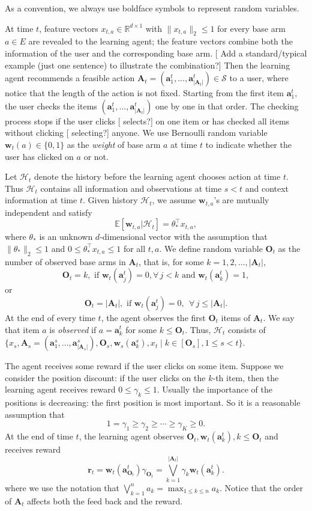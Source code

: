 \documentclass{article}
\newcommand{\EE}{\mathbb{E}}
\newcommand{\RR}{\mathbb{R}}
\newcommand{\bA}{\mathbf{A}}
\newcommand{\ba}{\mathbf{a}}
\newcommand{\bO}{\mathbf{O}}
\newcommand{\br}{\mathbf{r}}
\newcommand{\bw}{\mathbf{w}}
\newcommand{\cH}{\mathcal{H}}
\newcommand{\cS}{\mathcal{S}}
\newcommand{\abs}[1]{\left| #1 \right|}
\newcommand{\norm}[1]{\| #1 \|}
\newcommand{\shengyu}[1]{{\color{green!50!black} [\text{Shengyu:} #1]}}
\begin{document}
As a convention, we always use boldface symbols to represent random variables.

At time $t$, feature vectors $x_{t,a} \in \RR^{d \times 1}$ with $\norm{x_{t,a}}_2 \leq 1$ for every base arm $a \in E$ are revealed to the learning agent; the feature vectors combine both the information of the user and the corresponding base arm. \shengyu{Add a standard/typical example (just one sentence) to illustrate the combination?} Then the learning agent recommends a feasible action $\bA_t=(\ba_{1}^t,...,\ba_{\abs{\bA_t}}^t) \in \cS$ to a user, where notice that the length of the action is not fixed. Starting from the first item $\ba_{1}^t$, the user checks the items $(\ba_{1}^t,...,\ba_{\abs{\bA_t}}^t)$ one by one in that order. The checking process stops if the user clicks \shengyu{selects?} on one item or has checked all items without clicking \shengyu{selecting?} anyone. We use Bernoulli random variable $\bw_{t}(a) \in \{0,1\}$ as the {\em weight} of base arm $a$ at time $t$ to indicate whether the user has clicked on $a$ or not. 

Let $\cH_t$ denote the history before the learning agent chooses action at time $t$.
Thus $\cH_t$ contains all information and observations at time $s < t$ and context information at time $t$. Given history $\cH_t$, we assume $\bw_{t,a}$'s are mutually independent and satisfy
\begin{equation} %
  \label{eq:expectation}
  \EE[\bw_{t,a} | \cH_t] = \theta_{\ast}^{\top} x_{t,a},
\end{equation}
where $\theta_{\ast}$ is an unknown $d$-dimensional vector with the assumption that $\norm{\theta_{\ast}}_2 \leq 1$ and $0 \leq \theta_{\ast}^{\top} x_{t,a} \leq 1$ for all $t, a$. 
We define random variable $\bO_t$ as the number of observed base arms in $\bA_t$, that is, for some $k=1,2,\ldots, \abs{\bA_t}$, 
$$
  \bO_t = k, \text{ if } \bw_t(\ba_j^t)=0, \forall\, j < k \text{ and } \bw_t(\ba_k^t) = 1,
$$
or 
$$
  \bO_t = \abs{\bA_t}, \text{ if }\bw_t(\ba_j^t) = 0, ~~ \forall\, j \leq \abs{\bA_t}.
$$
At the end of every time $t$, the agent observes the first $\bO_t$ items of $\bA_t$. We say that item $a$ is {\it observed} if $a = \ba_k^t$ for some $k \leq \bO_t$. 
Thus, $\cH_t$ consists of $\{x_s, \bA_s = (\ba_{1}^s,...,\ba_{\abs{\bA_s}}^s), \bO_s, \bw_s(\ba_k^s),x_t \mid  k \in[\bO_s], 1 \le s<t \}$.

The agent receives some reward if the user clicks on some item. Suppose we consider the position discount: if the user clicks on the $k$-th item, then the learning agent receives reward $0 \leq \gamma_k \leq 1$. Usually the importance of the positions is decreasing: the first position is most important. So it is a reasonable assumption that
$$
  1 = \gamma_1 \geq \gamma_2 \geq \cdots \geq \gamma_K \geq 0.
$$
At the end of time $t$, the learning agent observes $\bO_t, \bw_t(\ba_k^t), k \leq \bO_t$ and receives reward
$$
  \br_t = \bw_t(\ba_{\bO_t}^t) \gamma_{\bO_t} = \bigvee_{k=1}^{\abs{\bA_t}} \gamma_k \bw_t(\ba_k^t).
$$
where we use the notation that $\bigvee_{k=1}^n a_k = \max_{1 \leq k \leq n} a_k$. Notice that the order of $\bA_t$ affects both the feed back and the reward.
\end{document}
